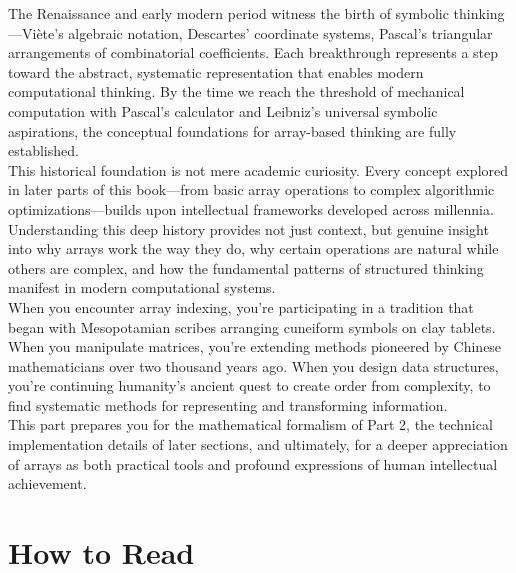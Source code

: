 \documentclass[12pt, oneside, openany]{book}
\begin{document}
The Renaissance and early modern period witness the birth of symbolic thinking—Viète's algebraic notation, Descartes' coordinate systems, Pascal's triangular arrangements of combinatorial coefficients. Each breakthrough represents a step toward the abstract, systematic representation that enables modern computational thinking. By the time we reach the threshold of mechanical computation with Pascal's calculator and Leibniz's universal symbolic aspirations, the conceptual foundations for array-based thinking are fully established.\\
This historical foundation is not mere academic curiosity. Every concept explored in later parts of this book—from basic array operations to complex algorithmic optimizations—builds upon intellectual frameworks developed across millennia. Understanding this deep history provides not just context, but genuine insight into why arrays work the way they do, why certain operations are natural while others are complex, and how the fundamental patterns of structured thinking manifest in modern computational systems.\\
When you encounter array indexing, you're participating in a tradition that began with Mesopotamian scribes arranging cuneiform symbols on clay tablets. When you manipulate matrices, you're extending methods pioneered by Chinese mathematicians over two thousand years ago. When you design data structures, you're continuing humanity's ancient quest to create order from complexity, to find systematic methods for representing and transforming information.\\
This part prepares you for the mathematical formalism of Part 2, the technical implementation details of later sections, and ultimately, for a deeper appreciation of arrays as both practical tools and profound expressions of human intellectual achievement.
\newpage
\section*{How to Read}
\end{document}
